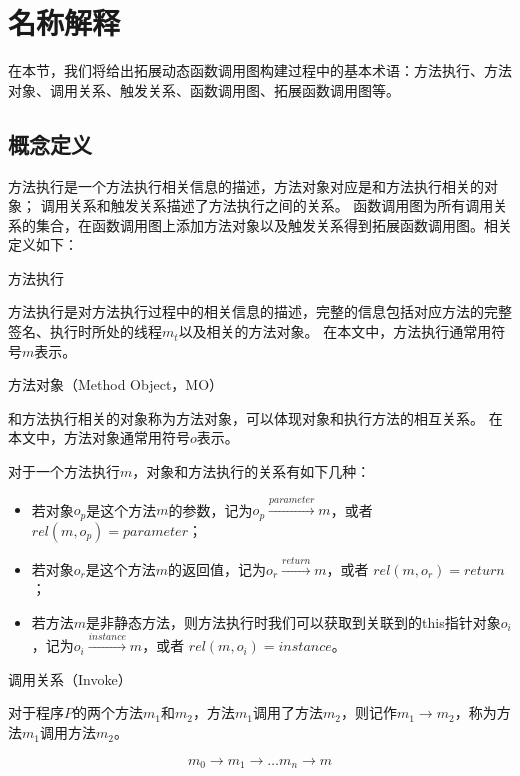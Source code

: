 \chapter{名称解释}


在本节，我们将给出拓展动态函数调用图构建过程中的基本术语：方法执行、方法对象、调用关系、触发关系、函数调用图、拓展函数调用图等。

\section{概念定义}
方法执行是一个方法执行相关信息的描述，方法对象对应是和方法执行相关的对象；
调用关系和触发关系描述了方法执行之间的关系。
函数调用图为所有调用关系的集合，在函数调用图上添加方法对象以及触发关系得到拓展函数调用图。相关定义如下：

\begin{myDef}方法执行\end{myDef}
	
	
	方法执行是对方法执行过程中的相关信息的描述，完整的信息包括对应方法的完整签名、执行时所处的线程$m_t$以及相关的方法对象。
	在本文中，方法执行通常用符号$m$表示。


\begin{myDef}
	方法对象（Method Object，MO）
\end{myDef}
	和方法执行相关的对象称为方法对象，可以体现对象和执行方法的相互关系。
	在本文中，方法对象通常用符号$o$表示。
	
	
	对于一个方法执行$m$，对象和方法执行的关系有如下几种：
	\begin{itemize}
		\item 若对象$o_p$是这个方法$m$的参数，记为$o_p \stackrel{parameter}{\longrightarrow} m$，或者 $ rel(m,o_p) = parameter$；
		\item 若对象$o_r$是这个方法$m$的返回值，记为$o_r \stackrel{return}{\longrightarrow} m$，或者 $ rel(m,o_r) = return$；
		\item 若方法$m$是非静态方法，则方法执行时我们可以获取到关联到的this指针对象$o_i$，记为$o_i \stackrel{instance}{\longrightarrow} m$，或者 $ rel(m,o_i) = instance$。
	\end{itemize}


\begin{myDef}
	调用关系（Invoke）
\end{myDef}
	对于程序$P$的两个方法$m_1$和$m_2$，方法$m_1$调用了方法$m_2$，则记作$m_1 \to m_2$，称为方法$m_1$调用方法$m_2$。

\begin{equation}
m_0 \to m_1 \to \dots m_n \to m  \label{equ:extend_invoke}
\end{equation}

